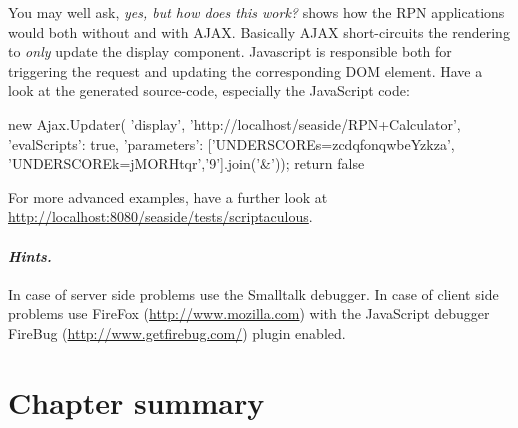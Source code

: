 \documentclass[a4paper,10pt,twoside]{book}
\begin{document}
You may well ask, \emph{yes, but how does this work?}
 shows how the RPN applications would both without and with AJAX.
Basically AJAX short-circuits the rendering to \emph{only} update the display component.
Javascript is responsible both for triggering the request and updating the corresponding DOM element.
Have a look at the generated source-code, especially the JavaScript code:

\begin{code}{}
new Ajax.Updater(
	'display',
	'http://localhost/seaside/RPN+Calculator',
	{'evalScripts': true,
	  'parameters': ['UNDERSCOREs=zcdqfonqwbeYzkza', 'UNDERSCOREk=jMORHtqr','9'].join('&')});
return false
\end{code}

For more advanced examples, have a further look at \url{http://localhost:8080/seaside/tests/scriptaculous}.

\paragraph{\emph{Hints.}}
In case of server side problems use the Smalltalk debugger.
In case of client side problems use FireFox (\url{http://www.mozilla.com}) with the JavaScript debugger FireBug (\url{http://www.getfirebug.com/}) plugin enabled.

\section{Chapter summary}
\end{document}
